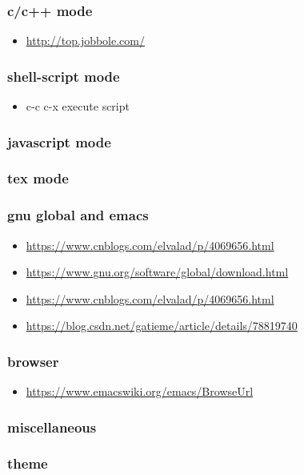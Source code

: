 \documentclass[11pt]{article}
\begin{document}
\subsubsection{c/c++ mode}
\label{sec:orge4f6cb4}
\begin{itemize}
\item \url{http://top.jobbole.com/}
\end{itemize}
\subsubsection{shell-script mode}
\label{sec:org2102631}
\begin{itemize}
\item c-c c-x execute script
\end{itemize}
\subsubsection{javascript mode}
\label{sec:org207f1fc}
\subsubsection{tex mode}
\label{sec:org5507c6e}
\subsubsection{gnu global and emacs}
\label{sec:org1b0f87c}
\begin{itemize}
\item \url{https://www.cnblogs.com/elvalad/p/4069656.html}
\item \url{https://www.gnu.org/software/global/download.html}
\item \url{https://www.cnblogs.com/elvalad/p/4069656.html}
\item \url{https://blog.csdn.net/gatieme/article/details/78819740}
\end{itemize}
\subsubsection{browser}
\label{sec:org01ffad8}
\begin{itemize}
\item \url{https://www.emacswiki.org/emacs/BrowseUrl}
\end{itemize}
\subsubsection{miscellaneous}
\label{sec:org6bdc3e7}
\subsubsection{theme}
\label{sec:orgf071d88}
\end{document}

